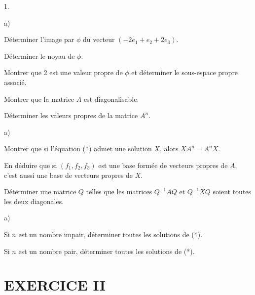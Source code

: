 \documentclass[11pt]{article}%
\begin{document}
\begin{noliste}{1.}
 \setlength{\itemsep}{4mm}
\item 

\begin{noliste}{a)}
 \setlength{\itemsep}{2mm}
\item Déterminer l'image par $\phi $ du vecteur $(-2e_{1} + e_{2} +
2e_{3})$.

\item Déterminer le noyau de $\phi $.

\item Montrer que 2 est une valeur propre de $\phi $ et déterminer le
sous-espace propre associé.

\item Montrer que la matrice $A$ est diagonalisable.

\item Déterminer les valeurs propres de la matrice $A^{n}$.
\end{noliste}

\item 

\begin{noliste}{a)}
 \setlength{\itemsep}{2mm}
\item Montrer que si l'équation (*) admet une solution $X$, alors
$XA^{n} = A^{n}X$.

\item En déduire que si $(f_{1},f_{2},f_{3})$ est une base formée de
vecteurs propres de $A$, c'est aussi une base de vecteurs propres de
$X$.

\item Déterminer une matrice $Q$ telles que les matrices $Q^{-1}AQ$ et
$Q^{-1}XQ$ soient toutes les deux diagonales.
\end{noliste}

\item 

\begin{noliste}{a)}
 \setlength{\itemsep}{2mm}
\item Si $n$ est un nombre impair, déterminer toutes les solutions de
(*).

\item Si $n$ est un nombre pair, déterminer toutes les solutions de
(*).
\end{noliste}
\end{noliste}

\section*{EXERCICE II}
\end{document}
